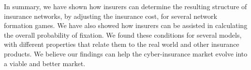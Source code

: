 In summary, we have shown how insurers can determine the resulting structure of insurance networks, by adjusting the insurance cost, for several network formation games. We have also showed how insurers can be assisted in calculating the overall probability of fixation.
We found these conditions for several models, with different properties that relate them to the real world and other insurance products. We believe our findings can help the cyber-insurance market evolve into a viable and better market.

